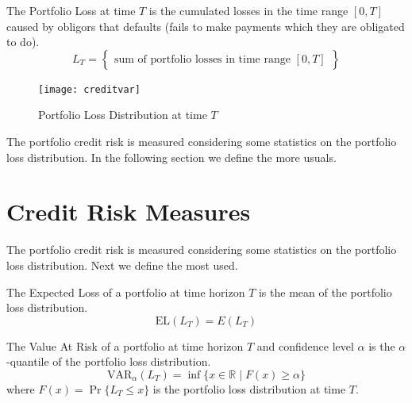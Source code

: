 \documentclass[11pt,fleqn]{book} %
\begin{document}
\begin{definition}
	The Portfolio Loss at time $T$ is the cumulated losses in the time 
	range $[0,T]$ caused by obligors that defaults (fails to make 
	payments which they are obligated to do).
	\begin{displaymath}
		L_T = \left\{
		\begin{array}{c}
			\text{sum of portfolio losses in time range $[0,T]$}
		\end{array}
		\right\}
	\end{displaymath}
\end{definition}

\begin{figure}[ht]
	\centering
	\texttt{[image: creditvar]}
	\caption{Portfolio Loss Distribution at time $T$}
\end{figure}

The portfolio credit risk is measured considering some statistics on 
the portfolio loss distribution. In the following section we define
the more usuals.

\section{Credit Risk Measures}

The portfolio credit risk is measured considering some statistics on 
the portfolio loss distribution. Next we define the most used.

\begin{definition}
	The Expected Loss of a portfolio at time horizon $T$ is the 
	mean of the portfolio loss distribution.
	\begin{displaymath}
		\text{EL}(L_T) = E(L_T)
	\end{displaymath}
\end{definition}

\begin{definition}
	The Value At Risk of a portfolio at time horizon $T$ and 
	confidence level $\alpha$ is the $\alpha$-quantile of the portfolio loss 
	distribution.
	\begin{displaymath}
		\text{VAR}_\alpha(L_T) = \inf\{x \in \mathbb{R} \mid F(x) \ge \alpha \}
	\end{displaymath}
	where $F(x)=\Pr\{L_T \le x\}$ is the portfolio loss distribution at time $T$.
\end{definition}
\end{document}
